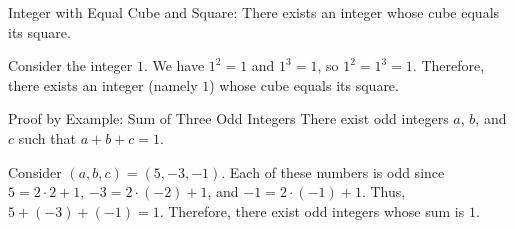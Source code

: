 \begin{claim}{Integer with Equal Cube and Square: There exists an integer whose cube equals its square.}\label{claim:integer-cube-square} %
  \begin{subprove}
    Consider the integer $1$. We have $1^2=1$ and $1^3=1$, so $1^2=1^3=1$.
    Therefore, there exists an integer (namely $1$) whose cube equals its square.
  \end{subprove}
\end{claim}

\begin{claim}{Proof by Example: Sum of Three Odd Integers}
  \label{claim:sum-three-odd-integers} 
  There exist odd integers $a$, $b$, and $c$ such that $a+b+c=1$.
  \begin{subprove}
    Consider $(a,b,c)=(5,-3,-1)$. Each of these numbers is odd 
    since $5=2\cdot 2 + 1$, $-3=2\cdot (-2) + 1$, and $-1=2\cdot (-1) + 1$. 
    Thus, $5+(-3)+(-1)=1$. Therefore, there exist odd integers whose sum is $1$.
  \end{subprove}
\end{claim}